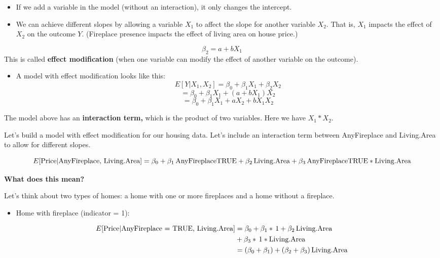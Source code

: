 \documentclass[
]{book}
\providecommand{\tightlist}{%
  \setlength{\itemsep}{0pt}\setlength{\parskip}{0pt}}
\begin{document}
\begin{itemize}
\item
  If we add a variable in the model (without an interaction), it only changes the intercept.
\item
  We can achieve different slopes by allowing a variable \(X_1\) to affect the slope for another variable \(X_2\). That is, \(X_1\) impacts the effect of \(X_2\) on the outcome \(Y\). (Fireplace presence impacts the effect of living area on house price.)
\end{itemize}

\[\beta_2 = a + bX_1\]
This is called \textbf{effect modification} (when one variable can modify the effect of another variable on the outcome).

\begin{itemize}
\tightlist
\item
  A model with effect modification looks like this:
  \[E[Y | X_1, X_2] = \beta_0 + \beta_1X_{1} + \beta_2X_{2} \]
  \[= \beta_0 + \beta_1X_{1} + (a+bX_1)X_{2}\]
  \[ = \beta_0 + \beta_1X_{1} +aX_2+bX_1X_{2}\]
\end{itemize}

The model above has an \textbf{interaction term,} which is the product of two variables. Here we have \(X_1*X_2\).

Let's build a model with effect modification for our housing data. Let's include an interaction term between AnyFireplace and Living.Area to allow for different slopes.

\[E[\hbox{Price}| \hbox{AnyFireplace, Living.Area}] = \beta_0+ \beta_1\,\hbox{AnyFireplaceTRUE}\\ + \beta_2\,\hbox{Living.Area} + \beta_3\,\hbox{AnyFireplaceTRUE}*\hbox{Living.Area}\]

\textbf{What does this mean?}

Let's think about two types of homes: a home with one or more fireplaces and a home without a fireplace.

\begin{itemize}
\tightlist
\item
  Home with fireplace (indicator = 1):
\end{itemize}

\begin{align*}
E[\hbox{Price}| \hbox{AnyFireplace = TRUE, Living.Area}] &= \beta_0 + \beta_1*\,1 + \beta_2\,\hbox{Living.Area}\\
& + \beta_3*\,1*\hbox{Living.Area}\\
&= (\beta_0 + \beta_1) + (\beta_2+\beta_3)\,\hbox{Living.Area}\\
\end{align*}
\end{document}
